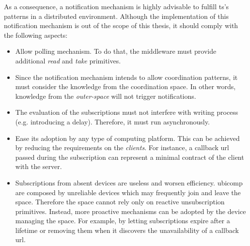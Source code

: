 As a consequence, a notification mechanism is highly advisable to fulfill \ac{ts}'s patterns in a distributed environment.
Although the implementation of this notification mechanism is out of the scope of this thesis,
it should comply with the following aspects:
\begin{itemize}
  \item Allow polling mechanism.
        To do that, the middleware must provide additional \emph{read} and \emph{take} primitives.
  \item Since the notification mechanism intends to allow coordination patterns,
        it must consider the knowledge from the coordination space. %
        In other words, knowledge from the \emph{outer-space} will not trigger notifications. %
  \item The evaluation of the subscriptions must not interfere with writing process (e.g. introducing a delay).
        Therefore, it must run asynchronously.
  \item Ease its adoption by any type of computing platform.
	This can be achieved by reducing the requirements on the \emph{clients}.
        For instance, a callback \ac{url} passed during the subscription can represent a minimal contract of the client with the server. %
  \item Subscriptions from absent devices are useless and worsen efficiency.
	\ac{ubicomp} are composed by unreliable devices which may frequently join and leave the space.
	Therefore the space cannot rely only on reactive unsubscription primitives.
	Instead, more proactive mechanisms can be adopted by the device managing the space. %
	For example, by letting subscriptions expire after a lifetime or removing them when it discovers the unavailability of a callback \ac{url}. %
\end{itemize}


